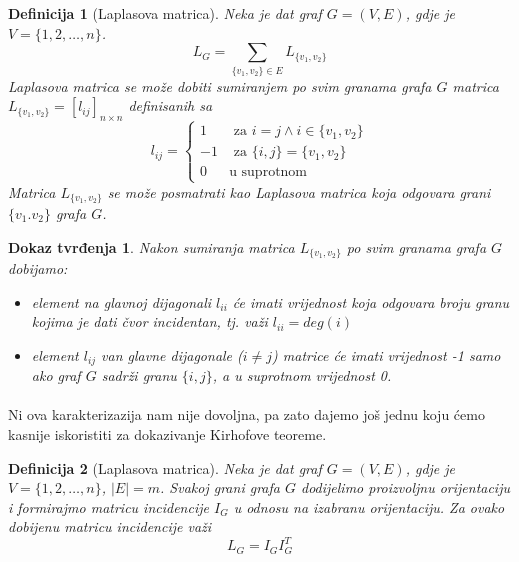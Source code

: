 \documentclass[11pt]{article}
\newtheorem{definition}{Definicija}
\newtheorem*{custom_proof}{Dokaz tvrđenja}
\begin{document}
			\begin{definition}[Laplasova matrica]
			Neka je dat graf $G = (V, E)$, gdje je $V = \{1, 2, \dots, n\}$. 
			\[
				L_G = \sum_{\{v_1,v_2\} \in E} L_{\{v_1,v_2\}}
			\] 
			Laplasova matrica se može dobiti sumiranjem po svim granama grafa $G$ matrica $L_{\{v_1,v_2\}} = [l_{ij}]_{n \times n}$ definisanih sa
			\[
				 l_{ij} =
				 \begin{cases}
				 1  & \text{ za } i = j  \land i \in \{v_1,v_2\} \\
				 -1 & \text{ za } \{i,j\} = \{v_1,v_2\} \\ 
				 0  & \text{u suprotnom}
				 \end{cases}
			 \]
			Matrica $L_{\{v_1,v_2\}}$ se može posmatrati kao Laplasova matrica koja odgovara grani $\{v_1.v_2\}$ grafa $G$.
			\end{definition}
			
			\begin{custom_proof}
			Nakon sumiranja matrica $L_{\{v_1,v_2\}}$ po svim granama grafa $G$ dobijamo:
				\begin{itemize}
				\item element na glavnoj dijagonali $l_{ii}$ će imati vrijednost koja odgovara broju granu kojima je dati čvor incidentan, tj. važi $l_{ii} = deg(i)$
				\item element $l_{ij}$ van glavne dijagonale ($i \neq j$) matrice će imati vrijednost -1 samo ako graf $G$ sadrži granu $\{i,j\}$, a u suprotnom vrijednost 0.  
				\end{itemize}
			\end{custom_proof}
		
			\paragraph{}
			Ni ova karakterizazija nam nije dovoljna, pa zato dajemo još jednu koju ćemo kasnije iskoristiti za dokazivanje Kirhofove teoreme.
	
			\begin{definition}[Laplasova matrica] 
			Neka je dat graf $G = (V, E)$, gdje je $V = \{1, 2, \dots, n\}$, $|E| = m$. Svakoj grani grafa $G$ dodijelimo proizvoljnu orijentaciju i formirajmo matricu incidencije $I_G$ u odnosu na izabranu orijentaciju.
			Za ovako dobijenu matricu incidencije važi
			 \[
				 L_G = I_G I_G^T
			 \]
			\end{definition}
	
\end{document}
